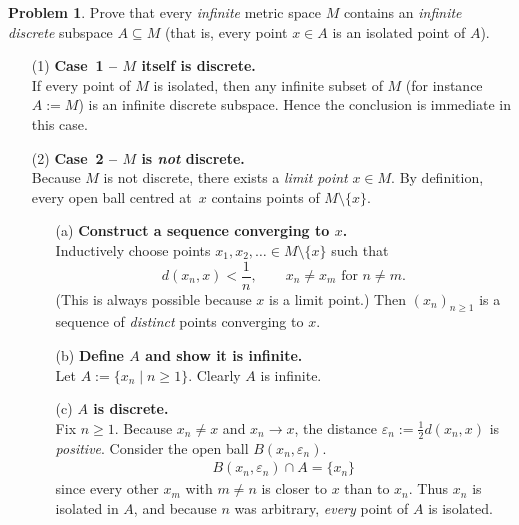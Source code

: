 \documentclass[12pt]{article}
\theoremstyle{definition} %
\newtheorem{problem}{Problem}
\theoremstyle{plain} %
\begin{document}
\begin{problem}
  Prove that every \emph{infinite} metric space $M$ contains an \emph{infinite
  discrete} subspace $A\subseteq M$ (that is, every point $x\in A$ is an isolated
  point of $A$).

  \begin{enumerate}
      \item[(1)] \textbf{Case 1 – $M$ itself is discrete.}\\
            If every point of $M$ is isolated, then any infinite subset of $M$
            (for instance $A:=M$) is an infinite discrete subspace.  
            Hence the conclusion is immediate in this case.

      \item[(2)] \textbf{Case 2 – $M$ is \emph{not} discrete.}\\
            Because $M$ is not discrete, there exists a \emph{limit point}
            $x\in M$.  By definition, every open ball centred at~$x$ contains
            points of $M\setminus\{x\}$.

            \begin{enumerate}
                \item[(a)] \textbf{Construct a sequence converging to $x$.}\\
                      Inductively choose points
                      $x_1,x_2,\dots\in M\setminus\{x\}$ such that
                      \[
                          d(x_n,x)<\frac1{n},
                          \qquad
                          x_n\neq x_m\text{ for }n\neq m .
                      \]
                      (This is always possible because $x$ is a limit point.)
                      Then $(x_n)_{n\ge1}$ is a sequence of \emph{distinct}
                      points converging to $x$.

                \item[(b)] \textbf{Define $A$ and show it is infinite.}\\
                      Let
                      $
                          A:=\{x_n\mid n\ge1\}.
                      $
                      Clearly $A$ is infinite.

                \item[(c)] \textbf{$A$ is discrete.}\\
                      Fix $n\ge1$.  
                      Because $x_n\neq x$ and $x_n\to x$, the distance
                      $\varepsilon_n:=\tfrac12 d(x_n,x)$ is \emph{positive}.
                      Consider the open ball $B(x_n,\varepsilon_n)$.
                      \begin{align}
                          B(x_n,\varepsilon_n)\cap A
                          =\{x_n\}
                      \end{align}
                      since every other $x_m$ with $m\neq n$ is closer to $x$
                      than to $x_n$.  
                      Thus $x_n$ is isolated in $A$, and because $n$ was
                      arbitrary, \emph{every} point of $A$ is isolated.
            \end{enumerate}


\end{enumerate}
\end{problem}
\end{document}
